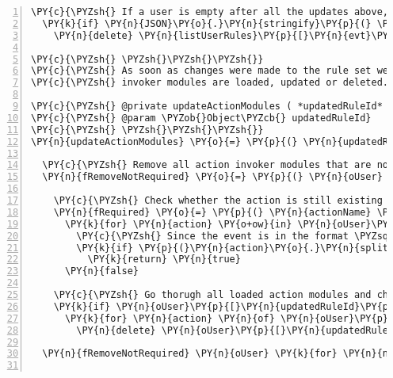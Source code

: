 \begin{Verbatim}[fontsize=\scriptsize,commandchars=\\\{\},numbers=left,firstnumber=1,stepnumber=1]
  \PY{c}{\PYZsh{} If a user is empty after all the updates above, we remove her from the list}
  \PY{k}{if} \PY{n}{JSON}\PY{o}{.}\PY{n}{stringify}\PY{p}{(} \PY{n}{oUser} \PY{p}{)} \PY{o+ow}{is} \PY{l+s}{\PYZdq{}}\PY{l+s}{\PYZob{}\PYZcb{}}\PY{l+s}{\PYZdq{}}
    \PY{n}{delete} \PY{n}{listUserRules}\PY{p}{[}\PY{n}{evt}\PY{o}{.}\PY{n}{user}\PY{p}{]}

\PY{c}{\PYZsh{} \PYZsh{}\PYZsh{}\PYZsh{}}
\PY{c}{\PYZsh{} As soon as changes were made to the rule set we need to ensure that the aprropriate action}
\PY{c}{\PYZsh{} invoker modules are loaded, updated or deleted.}

\PY{c}{\PYZsh{} @private updateActionModules ( *updatedRuleId* )}
\PY{c}{\PYZsh{} @param \PYZob{}Object\PYZcb{} updatedRuleId}
\PY{c}{\PYZsh{} \PYZsh{}\PYZsh{}\PYZsh{}}
\PY{n}{updateActionModules} \PY{o}{=} \PY{p}{(} \PY{n}{updatedRuleId} \PY{p}{)} \PY{o}{=}\PY{o}{\PYZgt{}}
  
  \PY{c}{\PYZsh{} Remove all action invoker modules that are not required anymore}
  \PY{n}{fRemoveNotRequired} \PY{o}{=} \PY{p}{(} \PY{n}{oUser} \PY{p}{)} \PY{o}{\PYZhy{}}\PY{o}{\PYZgt{}}

    \PY{c}{\PYZsh{} Check whether the action is still existing in the rule}
    \PY{n}{fRequired} \PY{o}{=} \PY{p}{(} \PY{n}{actionName} \PY{p}{)} \PY{o}{\PYZhy{}}\PY{o}{\PYZgt{}}
      \PY{k}{for} \PY{n}{action} \PY{o+ow}{in} \PY{n}{oUser}\PY{p}{[}\PY{n}{updatedRuleId}\PY{p}{]}\PY{o}{.}\PY{n}{rule}\PY{o}{.}\PY{n}{actions}
        \PY{c}{\PYZsh{} Since the event is in the format \PYZsq{}module \PYZhy{}\PYZgt{} function\PYZsq{} we need to split the string}
        \PY{k}{if} \PY{p}{(}\PY{n}{action}\PY{o}{.}\PY{n}{split} \PY{l+s}{\PYZsq{}}\PY{l+s}{ \PYZhy{}\PYZgt{} }\PY{l+s}{\PYZsq{}}\PY{p}{)}\PY{p}{[} \PY{l+m+mi}{0} \PY{p}{]} \PY{o+ow}{is} \PY{n}{actionName}
          \PY{k}{return} \PY{n}{true}
      \PY{n}{false}

    \PY{c}{\PYZsh{} Go thorugh all loaded action modules and check whether the action is still required}
    \PY{k}{if} \PY{n}{oUser}\PY{p}{[}\PY{n}{updatedRuleId}\PY{p}{]}
      \PY{k}{for} \PY{n}{action} \PY{n}{of} \PY{n}{oUser}\PY{p}{[}\PY{n}{updatedRuleId}\PY{p}{]}\PY{o}{.}\PY{n}{rule}\PY{o}{.}\PY{n}{actions} 
        \PY{n}{delete} \PY{n}{oUser}\PY{p}{[}\PY{n}{updatedRuleId}\PY{p}{]}\PY{o}{.}\PY{n}{actions}\PY{p}{[}\PY{n}{action}\PY{p}{]} \PY{k}{if} \PY{o+ow}{not} \PY{n}{fRequired} \PY{n}{action}

  \PY{n}{fRemoveNotRequired} \PY{n}{oUser} \PY{k}{for} \PY{n}{name}\PY{p}{,} \PY{n}{oUser} \PY{n}{of} \PY{n}{listUserRules}


\end{Verbatim}
